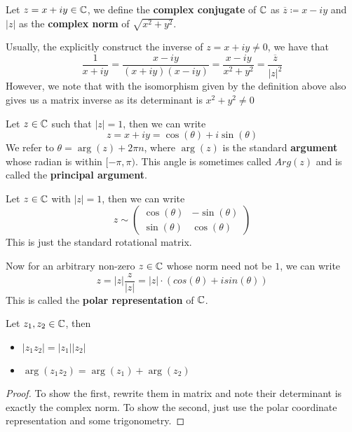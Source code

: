 \begin{definition}
    Let $z = x + iy \in \mathbb{C}$, we define the \textbf{complex conjugate} of $\mathbb{C}$ as $\overline{z} \coloneqq x - iy$ and $|z|$ as the \textbf{complex norm} of $\sqrt{x^2 + y^2}$.
\end{definition}

\begin{remark}
    Usually, the explicitly construct the inverse of $z = x + iy \neq 0$, we have that
    \[\frac{1}{x + iy} = \frac{x - iy}{(x + iy)(x - iy)} = \frac{x - iy}{x^2 + y^2} = \frac{\overline{z}}{|z|^2}\]
    However, we note that with the isomorphism given by the definition above also gives us a matrix inverse as its determinant is $x^2 + y^2 \neq 0$ 
\end{remark}

\begin{definition}
Let $z \in \mathbb{C}$ such that $|z| = 1$, then we can write
\[z = x + iy = \cos(\theta) + i \sin(\theta)\]
We refer to $\theta = \arg(z) + 2 \pi n$, where $\arg(z)$ is the standard \textbf{argument} whose radian is within $[-\pi, \pi)$. This angle is sometimes called $Arg(z)$ and is called the \textbf{principal argument}.
\end{definition}

\noindent Let $z \in \mathbb{C}$ with $|z| = 1$, then we can write
\[z \sim \begin{pmatrix} \cos(\theta) & -\sin(\theta)\\ \sin(\theta) & \cos(\theta) \end{pmatrix}\]
This is just the standard rotational matrix.

\noindent Now for an arbitrary non-zero $z \in \mathbb{C}$ whose norm need not be $1$, we can write
\[z = |z| \frac{z}{|z|} = |z| \cdot (cos(\theta) + i sin(\theta))\]
This is called the \textbf{polar representation} of $\mathbb{C}$.

\begin{proposition}
    Let $z_1, z_2 \in \mathbb{C}$, then
    \begin{itemize}
        \item $|z_1 z_2| = |z_1| |z_2|$
        \item $\arg(z_1 z_2) = \arg(z_1) + \arg(z_2)$
    \end{itemize}
\end{proposition}

\begin{proof}
    To show the first, rewrite them in matrix and note their determinant is exactly the complex norm. To show the second, just use the polar coordinate representation and some trigonometry.
\end{proof}


